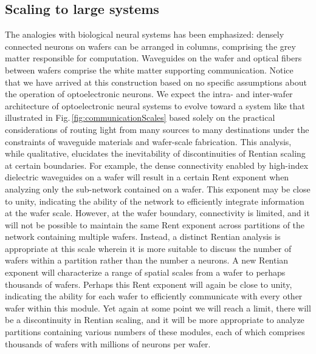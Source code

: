 \documentclass[twocolumn]{article}
\begin{document}
\subsection{\label{sec:scalingToLargeSystems}Scaling to large systems}
The analogies with biological neural systems has been emphasized: densely connected neurons on wafers can be arranged in columns, comprising the grey matter responsible for computation. Waveguides on the wafer and optical fibers between wafers comprise the white matter supporting communication. Notice that we have arrived at this construction based on no specific assumptions about the operation of optoelectronic neurons. We expect the intra- and inter-wafer architecture of optoelectronic neural systems to evolve toward a system like that illustrated in Fig.\,\ref{fig:communicationScales} based solely on the practical considerations of routing light from many sources to many destinations under the constraints of waveguide materials and wafer-scale fabrication. This analysis, while qualitative, elucidates the inevitability of discontinuities of Rentian scaling at certain boundaries. For example, the dense connectivity enabled by high-index dielectric waveguides on a wafer will result in a certain Rent exponent when analyzing only the sub-network contained on a wafer. This exponent may be close to unity, indicating the ability of the network to efficiently integrate information at the wafer scale. However, at the wafer boundary, connectivity is limited, and it will not be possible to maintain the same Rent exponent across partitions of the network containing multiple wafers. Instead, a distinct Rentian analysis is appropriate at this scale wherein it is more suitable to discuss the number of wafers within a partition rather than the number a neurons. A new Rentian exponent will characterize a range of spatial scales from a wafer to perhaps thousands of wafers. Perhaps this Rent exponent will again be close to unity, indicating the ability for each wafer to efficiently communicate with every other wafer within this module. Yet again at some point we will reach a limit, there will be a discontinuity in Rentian scaling, and it will be more appropriate to analyze partitions containing various numbers of these modules, each of which comprises thousands of wafers with millions of neurons per wafer. 
\end{document}
